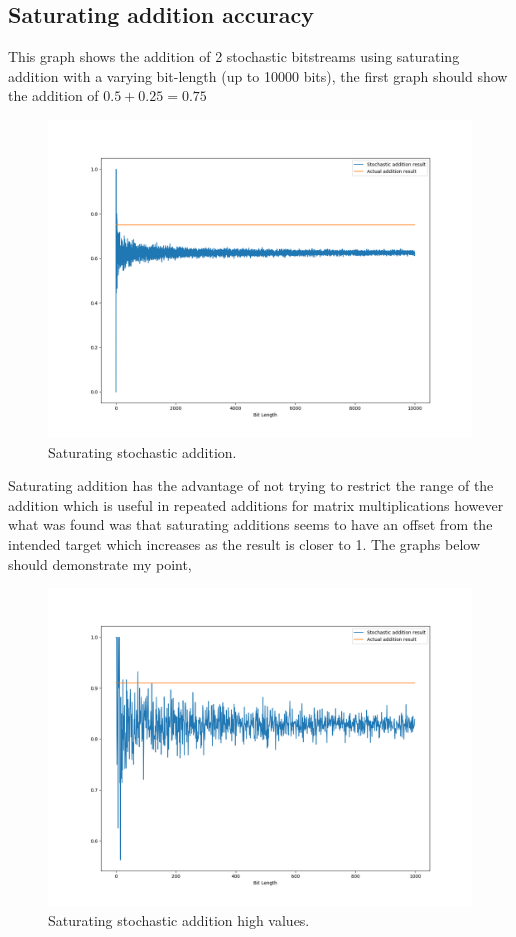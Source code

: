 \documentclass[a4paper,oneside,phd,etd]{BYUPhys}
\begin{document}
\subsection{Saturating addition accuracy}
This graph shows the addition of 2 stochastic bitstreams using saturating addition with a varying bit-length (up to 10000 bits), the first graph should show the addition of $0.5+0.25=0.75$

\begin{figure}[H]
\centering
\includegraphics[scale=0.4]{results/Figure_3.png}
\caption{Saturating stochastic addition.}
\label{fig:sat_add}
\end{figure}
Saturating addition has the advantage of not trying to restrict the range of the addition which is useful in repeated additions for matrix multiplications however what was found was that saturating additions seems to have an offset from the intended target which increases as the result is closer to 1. The graphs below should demonstrate my point,
\begin{figure}[H]
\centering
\includegraphics[scale=0.4]{results/Figure_3_high.png}
\caption{Saturating stochastic addition high values.}
\label{fig:sat_high}
\end{figure}
\end{document}
